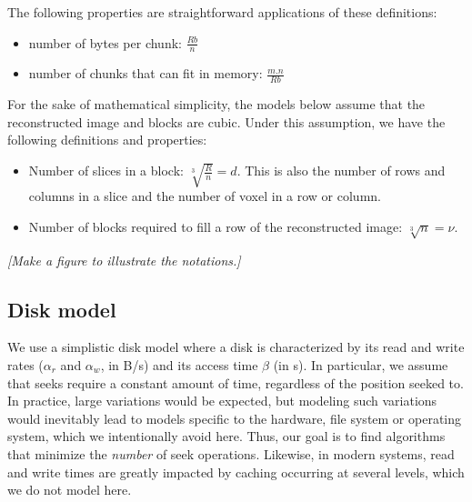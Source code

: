 \documentclass[10pt, conference, compsocconf]{IEEEtran}
\newcommand{\todo}[1]{
  \color{red}\emph{[#1]}
  \color{black}
}
\begin{document}
The following properties are straightforward applications of these
definitions:
\begin{itemize}
\item number of bytes per chunk: $\frac{Rb}{n}$
\item number of chunks that can fit in memory: $\frac{m.n}{Rb}$
\end{itemize}
For the sake of mathematical simplicity, the models below assume that
the reconstructed image and blocks are cubic. Under this assumption,
we have the following definitions and properties:
\begin{itemize}
\item Number of slices in a block: $\sqrt[3]{\frac{R}{n}}=d$. This is
  also the number of rows and columns in a slice and the number of
  voxel in a row or column.
\item Number of blocks required to fill a row of the reconstructed
  image: $\sqrt[3]{n}=\nu$.
\end{itemize}
\todo{Make a figure to illustrate the notations.}

\subsection{Disk model}

We use a simplistic disk model where a disk is characterized by its
read and write rates ($\alpha_r$ and $\alpha_w$, in B/s) and its
access time $\beta$ (in s). In particular, we assume that seeks
require a constant amount of time, regardless of the position seeked
to. In practice, large variations would be expected, but modeling such
variations would inevitably lead to models specific to the hardware,
file system or operating system, which we intentionally avoid
here. Thus, our goal is to find algorithms that minimize the
\emph{number} of seek operations. Likewise, in modern systems, read
and write times are greatly impacted by caching occurring at several
levels, which we do not model here.

\end{document}
